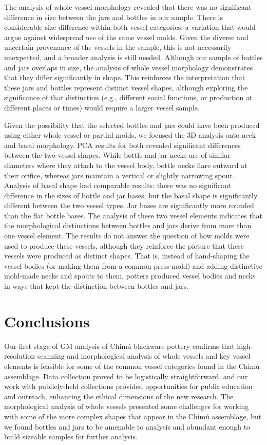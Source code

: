 \documentclass[]{interact}
\theoremstyle{plain}%
\theoremstyle{definition}
\theoremstyle{remark}
\begin{document}
The analysis of whole vessel morphology revealed that there was no
significant difference in size between the jars and bottles in our
sample. There is considerable size difference within both vessel
categories, a variation that would argue against widespread use of the
same vessel molds. Given the diverse and uncertain provenance of the
vessels in the sample, this is not necessarily unexpected, and a broader
analysis is still needed. Although our sample of bottles and jars
overlaps in size, the analysis of whole vessel morphology demonstrates
that they differ significantly in shape. This reinforces the
interpretation that these jars and bottles represent distinct vessel
shapes, although exploring the significance of that distinction (e.g.,
different social functions, or production at different places or times)
would require a larger vessel sample.

Given the possibility that the selected bottles and jars could have been
produced using either whole-vessel or partial molds, we focused the 3D
analysis onto neck and basal morphology. PCA results for both revealed
significant differences between the two vessel shapes. While bottle and
jar necks are of similar diameters where they attach to the vessel body,
bottle necks flare outward at their orifice, whereas jars maintain a
vertical or slightly narrowing spout. Analysis of basal shape had
comparable results: there was no significant difference in the sizes of
bottle and jar bases, but the basal shape is significantly different
between the two vessel types. Jar bases are significantly more rounded
than the flat bottle bases. The analysis of these two vessel elements
indicates that the morphological distinctions between bottles and jars
derive from more than one vessel element. The results do not answer the
question of how molds were used to produce these vessels, although they
reinforce the picture that these vessels were produced as distinct
shapes. That is, instead of hand-shaping the vessel bodies (or making
them from a common press-mold) and adding distinctive mold-made necks
and spouts to them, potters produced vessel bodies and necks in ways
that kept the distinction between bottles and jars.

\hypertarget{conclusions}{%
\section{Conclusions}\label{conclusions}}

Our first stage of GM analysis of Chimú blackware pottery confirms that
high-resolution scanning and morphological analysis of whole vessels and
key vessel elements is feasible for some of the common vessel categories
found in the Chimú assemblage. Data collection proved to be logistically
straightforward, and our work with publicly-held collections provided
opportunities for public education and outreach, enhancing the ethical
dimensions of the new research. The morphological analysis of whole
vessels presented some challenges for working with some of the more
complex shapes that appear in the Chimú assemblage, but we found bottles
and jars to be amenable to analysis and abundant enough to build
sizeable samples for further analysis.
\end{document}
